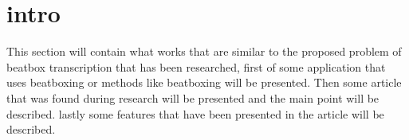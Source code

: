\section{intro}
This section will contain what works that are similar to the proposed problem of beatbox transcription that has been researched, first of some application that uses beatboxing or methods like beatboxing will be presented. Then some article that was found during research will be presented and the main point will be described. lastly some features that have been presented in the article will be described.